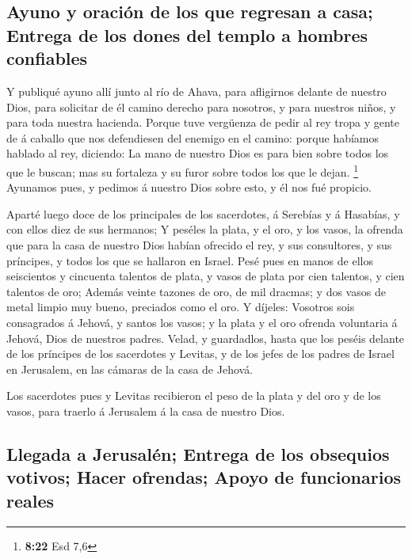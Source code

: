 \hypertarget{ayuno-y-oraciuxf3n-de-los-que-regresan-a-casa-entrega-de-los-dones-del-templo-a-hombres-confiables}{%
\subsection{Ayuno y oración de los que regresan a casa; Entrega de los
dones del templo a hombres
confiables}\label{ayuno-y-oraciuxf3n-de-los-que-regresan-a-casa-entrega-de-los-dones-del-templo-a-hombres-confiables}}

 Y publiqué ayuno allí junto al río de Ahava, para
afligirnos delante de nuestro Dios, para solicitar de él camino derecho
para nosotros, y para nuestros niños, y para toda nuestra hacienda.
 Porque tuve vergüenza de pedir al rey tropa y gente de á
caballo que nos defendiesen del enemigo en el camino: porque habíamos
hablado al rey, diciendo: La mano de nuestro Dios es para bien sobre
todos los que le buscan; mas su fortaleza y su furor sobre todos los que
le dejan. \footnote{\textbf{8:22} Esd 7,6}  Ayunamos pues,
y pedimos á nuestro Dios sobre esto, y él nos fué propicio.

 Aparté luego doce de los principales de los sacerdotes, á
Serebías y á Hasabías, y con ellos diez de sus hermanos;  Y
peséles la plata, y el oro, y los vasos, la ofrenda que para la casa de
nuestro Dios habían ofrecido el rey, y sus consultores, y sus príncipes,
y todos los que se hallaron en Israel.  Pesé pues en manos
de ellos seiscientos y cincuenta talentos de plata, y vasos de plata por
cien talentos, y cien talentos de oro;  Además veinte
tazones de oro, de mil dracmas; y dos vasos de metal limpio muy bueno,
preciados como el oro.  Y díjeles: Vosotros sois
consagrados á Jehová, y santos los vasos; y la plata y el oro ofrenda
voluntaria á Jehová, Dios de nuestros padres.  Velad, y
guardadlos, hasta que los peséis delante de los príncipes de los
sacerdotes y Levitas, y de los jefes de los padres de Israel en
Jerusalem, en las cámaras de la casa de Jehová.

 Los sacerdotes pues y Levitas recibieron el peso de la
plata y del oro y de los vasos, para traerlo á Jerusalem á la casa de
nuestro Dios.

\hypertarget{llegada-a-jerusaluxe9n-entrega-de-los-obsequios-votivos-hacer-ofrendas-apoyo-de-funcionarios-reales}{%
\subsection{Llegada a Jerusalén; Entrega de los obsequios votivos; Hacer
ofrendas; Apoyo de funcionarios
reales}\label{llegada-a-jerusaluxe9n-entrega-de-los-obsequios-votivos-hacer-ofrendas-apoyo-de-funcionarios-reales}}

